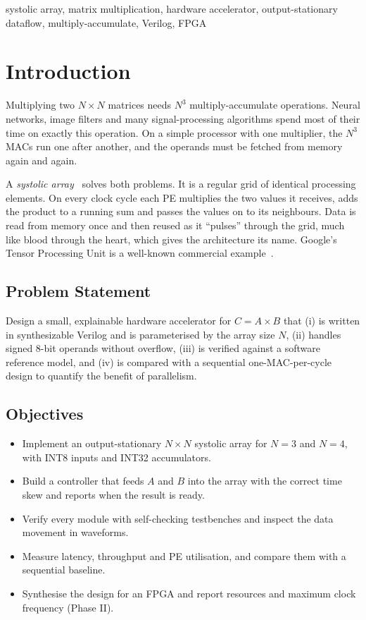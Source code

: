 \documentclass[conference,a4paper]{IEEEtran}
\begin{document}
\begin{IEEEkeywords}
systolic array, matrix multiplication, hardware accelerator, output-stationary dataflow, multiply-accumulate, Verilog, FPGA
\end{IEEEkeywords}

\section{Introduction}

Multiplying two $N\times N$ matrices needs $N^3$ multiply-accumulate operations. Neural networks, image filters and many signal-processing algorithms spend most of their time on exactly this operation. On a simple processor with one multiplier, the $N^3$ MACs run one after another, and the operands must be fetched from memory again and again.

A \emph{systolic array}~\cite{kung1979,kung1982} solves both problems. It is a regular grid of identical processing elements. On every clock cycle each PE multiplies the two values it receives, adds the product to a running sum and passes the values on to its neighbours. Data is read from memory once and then reused as it ``pulses'' through the grid, much like blood through the heart, which gives the architecture its name. Google's Tensor Processing Unit is a well-known commercial example~\cite{jouppi2017}.

\subsection{Problem Statement}
Design a small, explainable hardware accelerator for $C = A\times B$ that (i) is written in synthesizable Verilog and is parameterised by the array size $N$, (ii) handles signed 8-bit operands without overflow, (iii) is verified against a software reference model, and (iv) is compared with a sequential one-MAC-per-cycle design to quantify the benefit of parallelism.

\subsection{Objectives}
\begin{itemize}
\item Implement an output-stationary $N\times N$ systolic array for $N = 3$ and $N = 4$, with INT8 inputs and INT32 accumulators.
\item Build a controller that feeds $A$ and $B$ into the array with the correct time skew and reports when the result is ready.
\item Verify every module with self-checking testbenches and inspect the data movement in waveforms.
\item Measure latency, throughput and PE utilisation, and compare them with a sequential baseline.
\item Synthesise the design for an FPGA and report resources and maximum clock frequency (Phase II).
\end{itemize}
\end{document}
